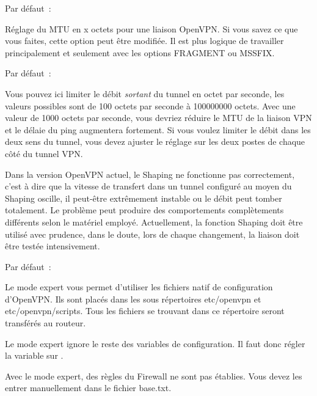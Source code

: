 \begin{description}

  Par défaut~: 

  Réglage du MTU en x octets pour une liaison OpenVPN. Si vous savez ce que vous
  faites, cette option peut être modifiée. Il est plus logique de travailler
  principalement et seulement avec les options FRAGMENT ou MSSFIX.


  Par défaut~: 

  Vous pouvez ici limiter le débit \emph{sortant} du tunnel en octet par seconde,
  les valeurs possibles sont de 100 octets par seconde à 100000000 octets. Avec
  une valeur de 1000 octets par seconde, vous devriez réduire le MTU de la liaison
  VPN et le délaie du ping augmentera fortement. Si vous voulez limiter le débit
  dans les deux sens du tunnel, vous devez ajuster le réglage sur les deux postes
  de chaque côté du tunnel VPN.

  Dans la version OpenVPN actuel, le Shaping ne fonctionne pas correctement,
  c'est à dire que la vitesse de transfert dans un tunnel configuré au moyen du
  Shaping oscille, il peut-être extrêmement instable ou le débit peut tomber
  totalement. Le problème peut produire des comportements complètements différents
  selon le matériel employé. Actuellement, la fonction Shaping doit être utilisé
  avec prudence, dans le doute, lors de chaque changement, la liaison doit être
  testée intensivement.


  Par défaut~: 

  Le mode expert vous permet d'utiliser les fichiers natif de configuration d'OpenVPN. 
  Ils sont placés dans les sous répertoires etc/openvpn et etc/openvpn/scripts.
  Tous les fichiers se trouvant dans ce répertoire seront transférés au routeur.

  Le mode expert ignore le reste des variables de configuration. Il faut donc
  régler la variable sur .

  Avec le mode expert, des règles du Firewall ne sont pas établies. Vous devez
  les entrer manuellement dans le fichier base.txt.

\end{description}

